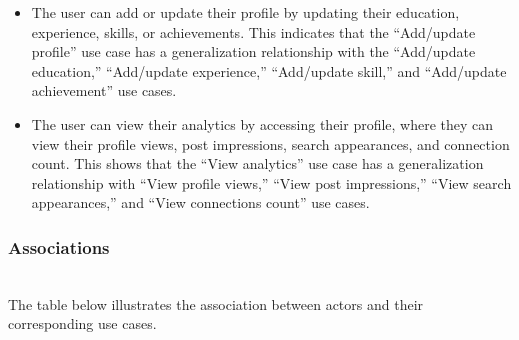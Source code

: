 \begin{itemize}
\item
The user can add or update their profile by updating their education, experience, skills, or achievements. This indicates that the ``Add/update profile'' use case has a generalization relationship with the ``Add/update education,'' ``Add/update experience,'' ``Add/update skill,'' and ``Add/update achievement'' use cases.
\item
The user can view their analytics by accessing their profile, where they can view their profile views, post impressions, search appearances, and connection count. This shows that the ``View analytics'' use case has a generalization relationship with ``View profile views,'' ``View post impressions,'' ``View search appearances,'' and ``View connections count'' use cases.
\end{itemize}

\subsubsection{Associations}\label{AcFr3AtcM23z2wua0ZnAg}
\\
The table below illustrates the association between actors and their corresponding use cases.

